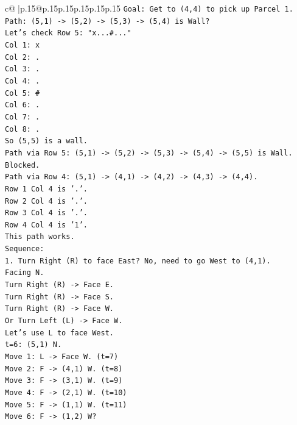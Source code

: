 \documentclass{article}
\begin{document}
{\begin{supertabular}{c@{$\;$}|p{.15\linewidth}@{}p{.15\linewidth}p{.15\linewidth}p{.15\linewidth}p{.15\linewidth}p{.15\linewidth}}
{{{\texttt{Goal: Get to (4,4) to pick up Parcel 1.} \\
\texttt{Path: (5,1) {-}> (5,2) {-}> (5,3) {-}> (5,4) is Wall?} \\
\texttt{Let's check Row 5: "x...\#..."} \\
\texttt{Col 1: x} \\
\texttt{Col 2: .} \\
\texttt{Col 3: .} \\
\texttt{Col 4: .} \\
\texttt{Col 5: \#} \\
\texttt{Col 6: .} \\
\texttt{Col 7: .} \\
\texttt{Col 8: .} \\
\texttt{So (5,5) is a wall.} \\
\texttt{Path via Row 5: (5,1) {-}> (5,2) {-}> (5,3) {-}> (5,4) {-}> (5,5) is Wall. Blocked.} \\
\texttt{Path via Row 4: (5,1) {-}> (4,1) {-}> (4,2) {-}> (4,3) {-}> (4,4).} \\
\texttt{Row 1 Col 4 is '.'.} \\
\texttt{Row 2 Col 4 is '.'.} \\
\texttt{Row 3 Col 4 is '.'.} \\
\texttt{Row 4 Col 4 is '1'.} \\
\texttt{This path works.} \\
\texttt{Sequence:} \\
\texttt{1. Turn Right (R) to face East? No, need to go West to (4,1).} \\
\texttt{Facing N.} \\
\texttt{Turn Right (R) {-}> Face E.} \\
\texttt{Turn Right (R) {-}> Face S.} \\
\texttt{Turn Right (R) {-}> Face W.} \\
\texttt{Or Turn Left (L) {-}> Face W.} \\
\texttt{Let's use L to face West.} \\
\texttt{t=6: (5,1) N.} \\
\texttt{Move 1: L {-}> Face W. (t=7)} \\
\texttt{Move 2: F {-}> (4,1) W. (t=8)} \\
\texttt{Move 3: F {-}> (3,1) W. (t=9)} \\
\texttt{Move 4: F {-}> (2,1) W. (t=10)} \\
\texttt{Move 5: F {-}> (1,1) W. (t=11)} \\
\texttt{Move 6: F {-}> (1,2) W?} \\
}}}
\end{supertabular}}
\end{document}
